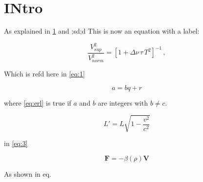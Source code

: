 \section{INtro}\label{sec:1}

As explained in \ref{sec:1} and ;sd;d
This is now an equation with a label:

\begin{equation}
\label{eq:1}
\frac{V_{ sup}^2}{V_{ norm}^2} = [1 + \Delta \nu \, \tau \, T^2 ]^{-1} \, ,
\end{equation}

Which is refd here in \ref{eq:1}

\begin{equation} \label{eq:erl}
a = bq + r
\end{equation}

where \eqref{eq:erl} is true if $a$ and $b$ are integers with $b \neq c$.

\begin{equation}
\label{eq:3}
  L' = {L}{\sqrt{1-\frac{v^2}{c^2}}}
 \end{equation}

in \ref{eq:3}

\begin{equation}
\mathbf{F} = -\beta(\rho) \mathbf{V}
\label{eq:linearbeta}
\end{equation}

As shown in eq. \rf


